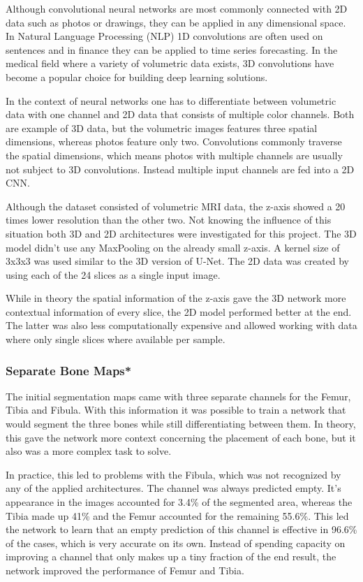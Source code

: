 Although convolutional neural networks are most commonly connected with 2D data such as photos or drawings, they can be applied in any dimensional space. In Natural Language Processing (NLP) 1D convolutions are often used on sentences and in finance they can be applied to time series forecasting. In the medical field where a variety of volumetric data exists, 3D convolutions have become a popular choice for building deep learning solutions.

In the context of neural networks one has to differentiate between volumetric data with one channel and 2D data that consists of multiple color channels. Both are example of 3D data, but the volumetric images features three spatial dimensions, whereas photos feature only two. Convolutions commonly traverse the spatial dimensions, which means photos with multiple channels are usually not subject to 3D convolutions. Instead multiple input channels are fed into a 2D CNN.

Although the dataset consisted of volumetric MRI data, the z-axis showed a 20 times lower resolution than the other two. Not knowing the influence of this situation both 3D and 2D architectures were investigated for this project. The 3D model didn't use any MaxPooling on the already small z-axis. A kernel size of 3x3x3 was used similar to the 3D version of U-Net. The 2D data was created by using each of the 24 slices as a single input image. 

While in theory the spatial information of the z-axis gave the 3D network more contextual information of every slice, the 2D model performed better at the end. The latter was also less computationally expensive and allowed working with data where only single slices where available per sample.

\subsubsection{Separate Bone Maps*}

The initial segmentation maps came with three separate channels for the Femur, Tibia and Fibula. With this information it was possible to train a network that would segment the three bones while still differentiating between them. In theory, this gave the network more context concerning the placement of each bone, but it also was a more complex task to solve. 

In practice, this led to problems with the Fibula, which was not recognized by any of the applied architectures. The channel was always predicted empty. It's appearance in the images accounted for 3.4\% of the segmented area, whereas the Tibia made up 41\% and the Femur accounted for the remaining 55.6\%. This led the network to learn that an empty prediction of this channel is effective in 96.6\% of the cases, which is very accurate on its own. Instead of spending capacity on improving a channel that only makes up a tiny fraction of the end result, the network improved the performance of Femur and Tibia.

